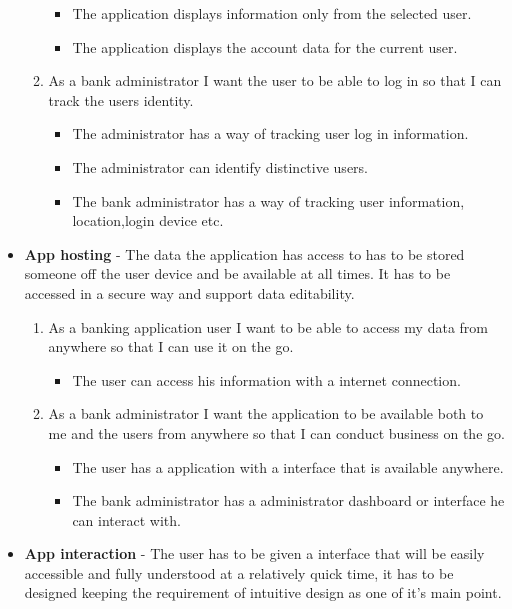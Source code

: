 \begin{itemize}
\begin{enumerate}
\begin{itemize}
                \item The application displays information only from the selected user.
                \item The application displays the account data for the current user.
            \end{itemize}
        \item As a bank administrator I want the user to be able to log in so that I can track the users identity.
            \begin{itemize}
                \item The administrator has a way of tracking user log in information.
                \item The administrator can identify distinctive users.
                \item The bank administrator has a way of tracking user information, location,login device etc.
            \end{itemize}
        \end{enumerate}
    \item  \textbf{App hosting} - The data the application has access to has to be stored someone off the user device and be available at all times. It has to be accessed in a secure way and support data editability.
        \begin{enumerate}
        \item As a banking application user I want to be able to access my data from anywhere so that I can use it on the go.
            \begin{itemize}
                \item The user can access his information with a internet connection.
            \end{itemize}
        \item As a bank administrator I want the application to be available both to me and the users from anywhere so that I can conduct business on the go.
            \begin{itemize}
                \item The user has a application with a interface that is available anywhere.
                \item The bank administrator has a administrator dashboard or interface he can interact with.
            \end{itemize}
        \end{enumerate}
    \item  \textbf{App interaction} - The user has to be given a interface that will be easily accessible and fully understood at a relatively quick time, it has to be designed keeping the requirement of intuitive design as one of it's main point.

\end{itemize}
